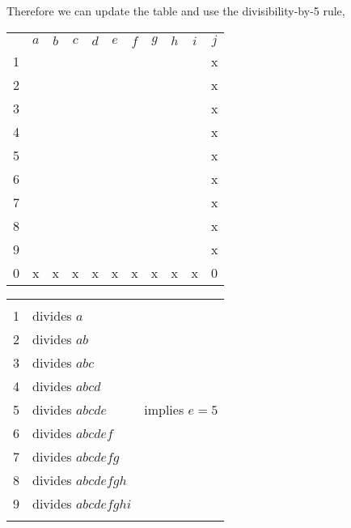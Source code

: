 Therefore we can update the table and use the divisibility-by-5 rule,
\begin{center}
\begin{tabular}{ccccccccccc}
			&	$a$	&	$b$	&	$c$	&	$d$	&	$e$	&	$f$	&	$g$	&	$h$	&	$i$	&	$j$	\\
	1		&		&		&		&		&		&		&		&		&		&	x	\\
	2		&		&		&		&		&		&		&		&		&		&	x	\\
	3		&		&		&		&		&		&		&		&		&		&	x	\\
	4		&		&		&		&		&		&		&		&		&		&	x	\\
	5		&		&		&		&		&		&		&		&		&		&	x	\\
	6		&		&		&		&		&		&		&		&		&		&	x	\\
	7		&		&		&		&		&		&		&		&		&		&	x	\\
	8		&		&		&		&		&		&		&		&		&		&	x	\\
	9		&		&		&		&		&		&		&		&		&		&	x	\\
	0		&	x	&	x	&	x	&	x	&	x	&	x	&	x	&	x	&	x	&	0	\\
\end{tabular}
\hspace{1cm}\vline\hspace{1cm}
\begin{tabular}{rll}
	& \\
	1	&	divides $a$						\\
	2	&	divides $ab$					\\
	3	&	divides $abc$					\\
	4	&	divides $abcd$					\\
	5	&	divides $abcde$				& implies $e=5$	\\
	6	&	divides $abcdef$				\\
	7	&	divides $abcdefg$				\\
	8	&	divides $abcdefgh$				\\
	9	&	divides $abcdefghi$				\\
		&	
\end{tabular}
\end{center}

